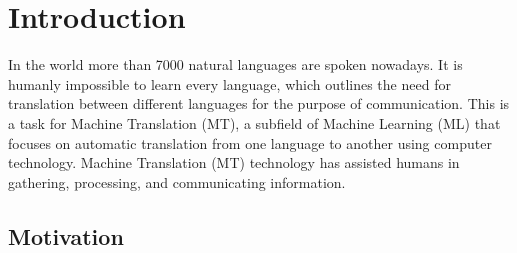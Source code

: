 \chapter{Introduction}
\label{ch:Introduction}





In the world more than 7000 natural languages are spoken nowadays. It is humanly impossible to learn every language, which outlines the need for translation between different languages for the purpose of communication. This is a task for Machine Translation (MT), a subfield of Machine Learning (ML) that focuses on automatic translation from one language to another using computer technology. Machine Translation (MT) technology has assisted humans in gathering, processing, and communicating information.  

\section{Motivation}
\label{sec:Introduction:Motivation}

